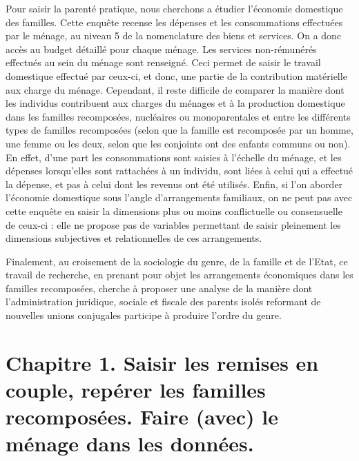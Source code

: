 \documentclass[
  12pt,
]{book}
\begin{document}
Pour saisir la parenté pratique, nous cherchons a étudier l'économie
domestique des familles. Cette enquête recense les dépenses et les
consommations effectuées par le ménage, au niveau 5 de la nomenclature
des biens et services. On a donc accès au budget détaillé pour chaque
ménage. Les services non-rémunérés effectués au sein du ménage sont
renseigné. Ceci permet de saisir le travail domestique effectué par
ceux-ci, et donc, une partie de la contribution matérielle aux charge du
ménage. Cependant, il reste difficile de comparer la manière dont les
individus contribuent aux charges du ménages et à la production
domestique dans les familles recomposées, nucléaires ou monoparentales
et entre les différents types de familles recomposées (selon que la
famille est recomposée par un homme, une femme ou les deux, selon que
les conjoints ont des enfants communs ou non). En effet, d'une part les
consommations sont saisies à l'échelle du ménage, et les dépenses
lorsqu'elles sont rattachées à un individu, sont liées à celui qui a
effectué la dépense, et pas à celui dont les revenus ont été utilisés.
Enfin, si l'on aborder l'économie domestique sous l'angle d'arrangements
familiaux, on ne peut pas avec cette enquête en saisir la dimensions
plus ou moins conflictuelle ou consensuelle de ceux-ci : elle ne propose
pas de variables permettant de saisir pleinement les dimensions
subjectives et relationnelles de ces arrangements.

Finalement, au croisement de la sociologie du genre, de la famille et de
l'Etat, ce travail de recherche, en prenant pour objet les arrangements
économiques dans les familles recomposées, cherche à proposer une
analyse de la manière dont l'administration juridique, sociale et
fiscale des parents isolés reformant de nouvelles unions conjugales
participe à produire l'ordre du genre.

\chapter{Chapitre 1. Saisir les remises en couple, repérer les familles
recomposées. Faire (avec) le ménage dans les
données.}\label{chapitre-1.-saisir-les-remises-en-couple-repuxe9rer-les-familles-recomposuxe9es.-faire-avec-le-muxe9nage-dans-les-donnuxe9es.}
\end{document}

